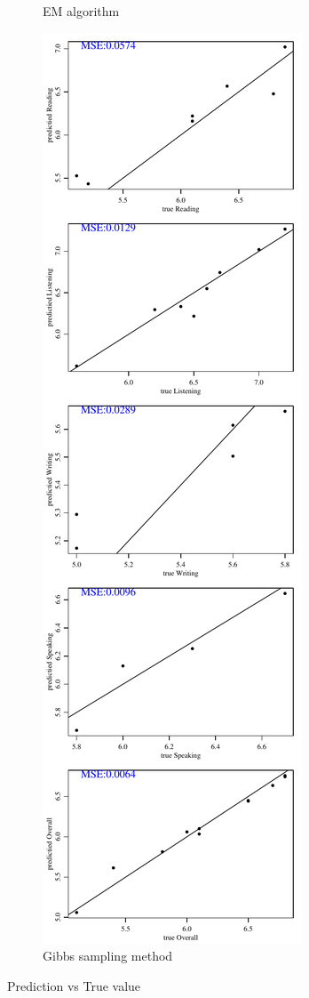 \documentclass[12pt]{article}
\begin{document}
\begin{figure}[h!]
\begin{subfigure}{0.4\textwidth}
    \caption{EM algorithm}
    \label{fig:0.20-empvt}
\end{subfigure}
\begin{subfigure}{0.4\textwidth}
    \includegraphics[height=.85\textheight]{pic/0.20/Gibbs_PredvsTrue.pdf}
    \caption{Gibbs sampling method}
    \label{fig:0.20-gibbspvt}
\end{subfigure}
        
\caption{Prediction vs True value}
\label{fig:0.20-pvt}
\end{figure}
\end{document}
